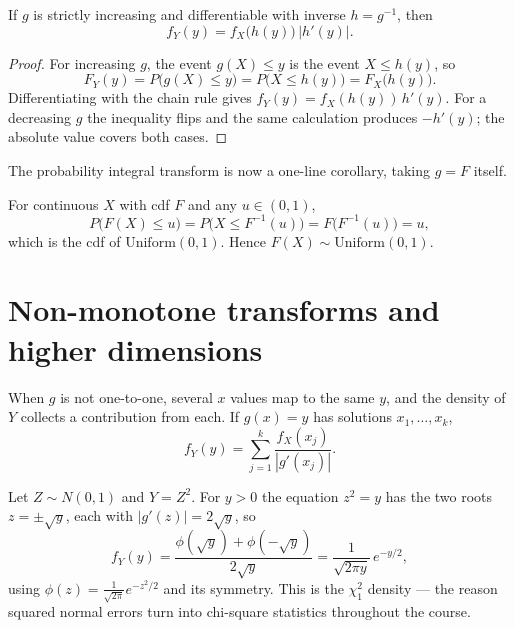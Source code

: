 \documentclass[11pt]{article}
\begin{document}
\begin{theorem}
If $g$ is strictly increasing and differentiable with inverse $h = g^{-1}$,
then
\[
  f_Y(y) = f_X\!\big(h(y)\big)\,\big|h'(y)\big|.
\]
\end{theorem}
\begin{proof}
For increasing $g$, the event $g(X) \le y$ is the event $X \le h(y)$, so
\[
  F_Y(y) = P\big(g(X) \le y\big) = P\big(X \le h(y)\big) = F_X\!\big(h(y)\big).
\]
Differentiating with the chain rule gives
$f_Y(y) = f_X(h(y))\,h'(y)$. For a decreasing $g$ the inequality flips and
the same calculation produces $-h'(y)$; the absolute value covers both cases.
\end{proof}

The probability integral transform is now a one-line corollary, taking
$g = F$ itself.

\begin{theorem}
For continuous $X$ with cdf $F$ and any $u \in (0,1)$,
\[
  P\big(F(X) \le u\big) = P\big(X \le F^{-1}(u)\big) = F\!\big(F^{-1}(u)\big) = u,
\]
which is the cdf of $\mathrm{Uniform}(0,1)$. Hence $F(X)\sim\mathrm{Uniform}(0,1)$.
\end{theorem}

\section{Non-monotone transforms and higher dimensions}

When $g$ is not one-to-one, several $x$ values map to the same $y$, and the
density of $Y$ collects a contribution from each. If $g(x)=y$ has solutions
$x_1,\dots,x_k$,
\[
  f_Y(y) = \sum_{j=1}^{k} \frac{f_X(x_j)}{|g'(x_j)|}.
\]

\begin{example}
Let $Z \sim N(0,1)$ and $Y = Z^2$. For $y>0$ the equation $z^2=y$ has the two
roots $z = \pm\sqrt y$, each with $|g'(z)| = 2\sqrt y$, so
\[
  f_Y(y) = \frac{\phi(\sqrt y) + \phi(-\sqrt y)}{2\sqrt y}
         = \frac{1}{\sqrt{2\pi y}}\,e^{-y/2},
\]
using $\phi(z)=\tfrac{1}{\sqrt{2\pi}}e^{-z^2/2}$ and its symmetry. This is the
$\chi^2_1$ density --- the reason squared normal errors turn into chi-square
statistics throughout the course.
\end{example}
\end{document}
